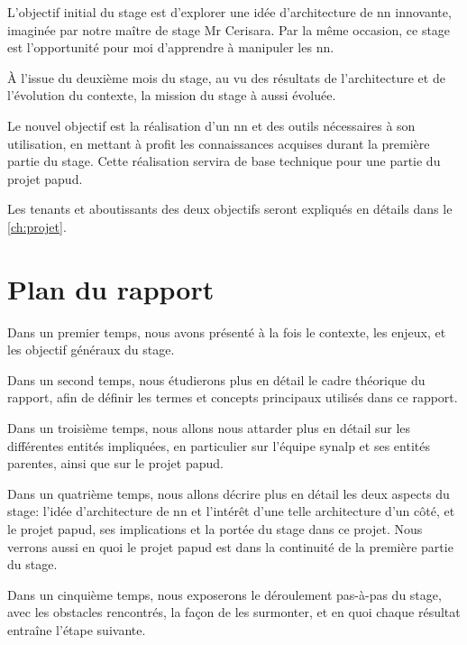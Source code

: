 L'objectif initial du stage est d'explorer une idée d'architecture de \gls{nn} innovante, imaginée par notre maître de stage Mr Cerisara.
Par la même occasion, ce stage est l'opportunité pour moi d'apprendre à manipuler les \gls{nn}.

À l'issue du deuxième mois du stage, au vu des résultats de l'architecture et de l'évolution du contexte, la mission du stage à aussi évoluée.

Le nouvel objectif est la réalisation d'un \gls{nn} et des outils nécessaires à son utilisation, en mettant à profit les connaissances acquises durant la première partie du stage.
Cette réalisation servira de base technique pour une partie du projet \gls{papud}.

Les tenants et aboutissants des deux objectifs seront expliqués en détails dans le \autoref{ch:projet}.

\section[Plan]{Plan du rapport}

Dans un premier temps, nous avons présenté à la fois le contexte, les enjeux, et les objectif généraux du stage.

Dans un second temps, nous étudierons plus en détail le cadre théorique du rapport, afin de définir les termes et concepts principaux utilisés dans ce rapport.

Dans un troisième temps, nous allons nous attarder plus en détail sur les différentes entités impliquées, en particulier sur l'équipe \gls{synalp} et ses entités parentes, ainsi que sur le projet \gls{papud}.

Dans un quatrième temps, nous allons décrire plus en détail les deux aspects du stage: l'idée d'architecture de \gls{nn} et l'intérêt d'une telle architecture d'un côté, et le projet \gls{papud}, ses implications et la portée du stage dans ce projet. Nous verrons aussi en quoi le projet \gls{papud} est dans la continuité de la première partie du stage.

Dans un cinquième temps, nous exposerons le déroulement pas-à-pas du stage, avec les obstacles rencontrés, la façon de les surmonter, et en quoi chaque résultat entraîne l'étape suivante. 


